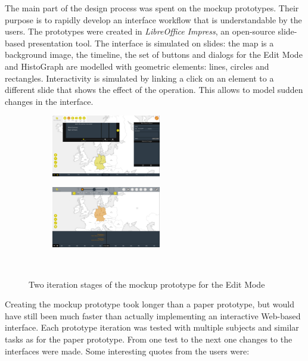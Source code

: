 The main part of the design process was spent on the mockup prototypes. Their purpose is to rapidly develop an interface workflow that is understandable by the users. The prototypes were created in \emph{LibreOffice Impress}, an open-source slide-based presentation tool. The interface is simulated on slides: the map is a background image, the timeline, the set of buttons and dialogs for the Edit Mode and HistoGraph are modelled with geometric elements: lines, circles and rectangles. Interactivity is simulated by linking a click on an element to a different slide that shows the effect of the operation. This allows to model sudden changes in the interface.

\begin{figure}[ht]
  \centering
  \begin{subfigure}[b]{.5\textwidth}
    \centering
    \includegraphics[width=180px]{graphics/development/design_process/mockup_prototype_1.png}
  \end{subfigure}%
  \begin{subfigure}[b]{.5\textwidth}
    \centering
    \includegraphics[width=180px]{graphics/development/design_process/mockup_prototype_3.png}
  \end{subfigure} \\[0.8em]

  \caption{Two iteration stages of the mockup prototype for the Edit Mode}
  \label{fig:mockup_prototypes}
\end{figure}

Creating the mockup prototype took longer than a paper prototype, but would have still been much faster than actually implementing an interactive Web-based interface. Each prototype iteration was tested with multiple subjects and similar tasks as for the paper prototype. From one test to the next one changes to the interfaces were made. Some interesting quotes from the users were:

